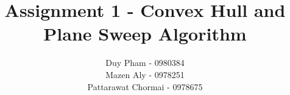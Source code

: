 \documentclass[12pt]{article}
\begin{document}
\title{Assignment 1 - Convex Hull and Plane Sweep Algorithm}
\author{
	Duy Pham - 0980384 \\
	Mazen Aly - 0978251 \\
	Pattarawat Chormai - 0978675 \\
}
\maketitle


\end{document}
